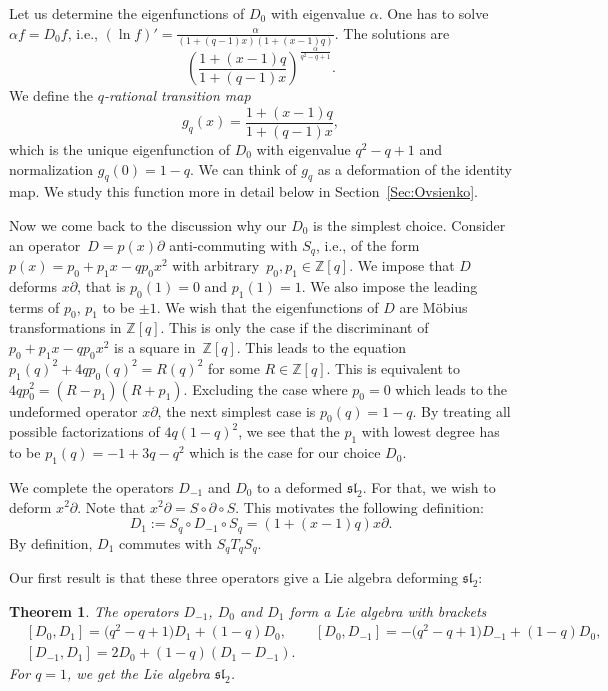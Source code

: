 \documentclass[pdftex]{sigma}
\numberwithin{equation}{section}
\newtheorem{Theorem}{Theorem}[section]
\newcommand*{\Z}{\mathbb{Z}}
\begin{document}
Let us determine the eigenfunctions of $D_0$ with eigenvalue $\alpha$. One has to solve $\alpha f=D_0 f$, i.e., $(\ln f)'=\frac{\alpha}{(1+(q-1)x)(1+(x-1)q)}$. The solutions are
\[
\left(\frac{1+(x-1)q}{1+(q-1)x}\right)^{\frac{\alpha}{q^2-q+1}}.
\]
We define the \emph{$q$-rational transition map}
\begin{equation}\label{Eq-def-g_q}
g_q(x)=\frac{1+(x-1)q}{1+(q-1)x},
\end{equation}
which is the unique eigenfunction of $D_0$ with eigenvalue $q^2-q+1$ and normalization $g_q(0)=1-q$. We can think of $g_q$ as a deformation of the identity map. We study this function more in detail below in Section~\ref{Sec:Ovsienko}.

Now we come back to the discussion why our $D_0$ is the simplest choice. Consider an operator~${D=p(x)\partial}$ anti-commuting with $S_q$, i.e., of the form $p(x)=p_0+p_1x-qp_0x^2$ with arbitrary~${p_0,p_1\in\Z[q]}$. We impose that $D$ deforms $x\partial$, that is $p_0(1)=0$ and $p_1(1)=1$. We also impose the leading terms of $p_0$, $p_1$ to be $\pm 1$. We wish that the eigenfunctions of $D$ are M\"obius transformations in $\Z[q]$. This is only the case if the discriminant of $p_0+p_1x-qp_0x^2$ is a square in~$\Z[q]$. This leads to the equation $p_1(q)^2+4qp_0(q)^2=R(q)^2$ for some $R\in\Z[q]$. This is equivalent to $4qp_0^2=(R-p_1)(R+p_1)$. Excluding the case where $p_0=0$ which leads to the undeformed operator $x\partial$, the next simplest case is $p_0(q)=1-q$. By treating all possible factorizations of $4q(1-q)^2$, we see that the $p_1$ with lowest degree has to be $p_1(q)=-1+3q-q^2$ which is the case for our choice $D_0$.


We complete the operators $D_{-1}$ and $D_0$ to a deformed $\mathfrak{sl}_2$. For that, we wish to deform $x^2\partial$.
Note that $x^2\partial = S\circ \partial\circ S$. This motivates the following definition:
\[
D_1:=S_q\circ D_{-1}\circ S_q=(1+(x-1)q)x\partial.
\]
By definition, $D_1$ commutes with $S_qT_qS_q$.

Our first result is that these three operators give a Lie algebra deforming $\mathfrak{sl}_2$:
\begin{Theorem}\label{Prop:deformed-sl2}
The operators $D_{-1}$, $D_0$ and $D_1$ form a Lie algebra with brackets
\begin{align*}
&[D_0,D_1]= \big(q^2-q+1\big)D_1+(1-q)D_0, \qquad
[D_0,D_{-1}] = -\big(q^2-q+1\big)D_{-1}+(1-q)D_0, \\
&[D_{-1},D_1]= 2D_0+(1-q)(D_{1}-D_{-1}).
\end{align*}
For $q=1$, we get the Lie algebra $\mathfrak{sl}_2$.
\end{Theorem}
\end{document}
